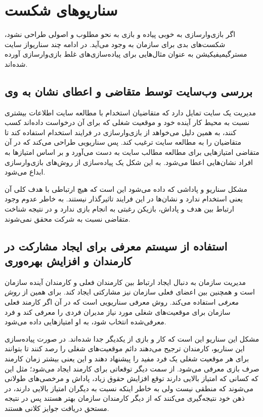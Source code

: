 \section{سناریوهای شکست}
اگر بازی‌وارسازی به خوبی پیاده و بازی به نحو مطلوب و اصولی طراحی نشود، شکست‌های بدی برای سازمان به وجود می‌آید. در ادامه چند سناریواز سایت مسترگیمیفیکیشن \cite{mrg} به عنوان مثال‌هایی برای پیاده‌سازی‌های غلط بازی‌وارسازی آورده شده‌اند.
\subsection{بررسی وب‌سایت توسط متقاضی و اعطای نشان به وی}
مدیریت یک سایت تمایل دارد که متقاضیان استخدام با مطالعه سایت اطلاعات بیشتری نسبت به محیط کار آینده خود و موقعیت شغلی که برای آن درخواست داده‌اند کسب کنند، به همین دلیل می‌خواهد از بازی‌وارسازی در فرایند استخدام استفاده کند تا متقاضیان را به مطالعه سایت ترغیب کند. پس سناریویی طراحی می‌کند که در آن متقاضی امتیازهایی برای مطالعه مطالب سایت به دست می‌آورد و بر اساس امتیازها به افراد نشان‌هایی اعطا می‌شود. به این شکل یک پیاده‌سازی از روش‌های بازی‌وارسازی ابداع می‌شود.

مشکل سناریو و پاداشی که داده می‌شود این است که هیچ ارتباطی با هدف کلی آن یعنی استخدام ندارد و نشان‌ها در این فرایند تاثیرگذار نیستند. به خاطر عدوم وجود ارتباط بین هدف و پاداش، بازیکن رغبتی به انجام بازی ندارد و در نتیجه شناخت متقاضی نسبت به شرکت محقق نمی‌شوند.
\subsection{استفاده از سیستم معرفی برای ایجاد مشارکت در کارمندان و افزایش بهره‌وری}
مدیریت سازمان به دنبال ایجاد ارتباط بین کارمندان فعلی و کارمندان آینده سازمان است و همچنین بین اعضای فعلی سازمان نیز مشارکتی ایجاد کند. برای همین از \emph{روش معرفی }استفاده می‌کند. روش معرفی سناریویی است که در آن اگر کارمند فعلی سازمان برای موقعیت‌های شغلی مورد نیاز مدیران فردی را معرفی کند و فرد معرفی‌شده انتخاب شود، به او امتیازهایی داده می‌شود.

مشکل این سناریو این است که کار و بازی از یکدیگر جدا شده‌اند. در صورت پیاده‌سازی این سناریو، کارمندان ترجیح می‌دهند دائم موقعیت‌های شغلی را رصد کنند تا بتوانند برای هر موقعیت شغلی یک فرد مفید را پیشنهاد دهند و این یعنی بیشتر زمان کارمند صرف بازی معرفی می‌شود. از سمت دیگر توقعاتی برای کارمند ایجاد می‌شود؛ مثل این که کسانی که امتیاز بالایی دارند توقع افزایش حقوق زیاد، پاداش و مرخصی‌های طولانی می‌شوند که منطقی نیست ولی به خاطر اینکه نسبت به دیگران امتیاز بالایی دارند، در ذهن خود نتیجه‌گیری می‌کنند که از دیگر کارمندان سازمان بهتر هستند پس در نتیجه مستحق دریافت جوایز کلانی هستند.